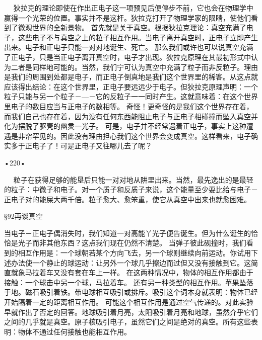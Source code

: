   
狄拉克的理论即使在作出正电子这一项预见后便停步不前，它也会在物理学中赢得一个光荣的位置。事实并不是这杆。狄拉克打开了物理学家的限睛，使他们看到了微观世界的全新景物。
首先就是关于真空。根据狄拉克理论：真空充满了电子，这些电子不与真空之上的粒子相互作用。当电子离开真空时，正电子立即产生出来。电子和正电子只能一对对地诞生、死亡。
那么我们或许也可以说真空充满了正电子，只是当正电子离开真空时，电子才出现。狄拉克原理在其最初形式中认为二者是同样地可能的。当然，我们宁可认为真空中充满了粒子而非反粒子。理由是我们的周围到处都是电子，而正电子倒真地是我们这个世界里的稀客。从这点就应该得出结论：在这个世界里，正电子要远远少于电子。但狄拉克原理声明：一个粒子只能与另一个粒子－—－它的反粒子一一同时产生。这就意味着：在这个世界里电子的数目应当与正电子的数相等。
奇怪！更奇怪的是我们这个世界存在着，而我们自己也存在着，因为没有任何东西能阻止电子与正电子相碰撞而坠入真空并化为摆脱了驱壳的幽灵一光子。
可是，电子并不经常遇着正电子，事实上这种遭遇是非帘罕见的。因此没有理由担心我们这个世界会变成真空。这样看来，电子确实多于正电子了！可是正电子又往哪儿去了呢？

•220•
  










  
粒子在获得足够的能垦后只能一对对地从阱里出来。当然，最先逸出的是最轻的粒子：中微子和电子。对一个质子和反质子来说，这个能量至少耍比给与电子－正电子对的能屎大两千倍。粒子愈大、愈笨重，使它从真空中出来也就愈困难。

§92再谈真空

当电子－正电子偶消失时，我们知道一对高能丫光子便告诞生。但为什么诞生的恰恰是光子而非其他东西？这点我们现在仍然不清楚。
当弹子彼此砚撞时，我们看到的相互作用是：一个球朝若某个方向飞去，另一个球则继续向前运动。你试用下述办法使一个静止的球运动：让另外一个球几乎擦边而过但又没有接触到它。这简直就象马拉着车又没有套在车上一样。
在这两种情况中，物体的相互作用都由于接触：一个球击中另一个球，马拉着车。
还有另一种类型的相互作用。苹果坠落于地。磁石吸引着铁。带电球相互吸引或排斥。吸引这个词本身就表明：物体已经开始隔着一定的距离相互作用。
可能这个相互作用是通过空气传递的。对此实验早就作出了否定的回答。地球吸引着月亮，太阳吸引着月亮和地球，虽然介乎它们之间的几乎就是真空。原子核吸引电子，虽然它们之间是绝对的真空。所有这些表明：物体不通过任何接触也能相互作用。

